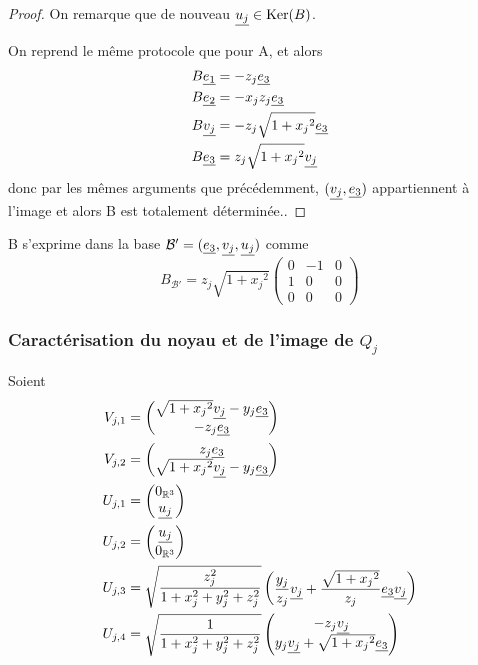 \begin{proof}
  On remarque que de nouveau ${\underline{u_j}} \in \operatorname{Ker}(B)$.

  On reprend le même protocole que pour A, et alors
\begin{align*}
 B \underline{e_1} &= -{z_j} \underline{e_3}\\
 B \underline{e_2} &= -{x_jz_j} \underline{e_3}\\
 B {\underline{v_j}} &= -{z_j}\sqrt{1+{x_j}^2}\underline{e_3}\\
 B \underline{e_3} &= {z_j}\sqrt{1+{x_j}^2}{\underline{v_j}}
\end{align*}
 donc par les mêmes arguments que précédemment, $({\underline{v_j}},\underline{e_3})$ appartiennent à l'image et alors B est totalement déterminée..
\end{proof}

\begin{defn}
  B s'exprime dans la base $\mathcal{B'}= (\underline{e_3},{\underline{v_j}},{\underline{u_j}})$ comme
  \[
    B_\mathcal{B'} = {z_j}\sqrt{1+{x_j}^2}
    \begin{pmatrix}
      0 & -1 & 0 \\
      1 & 0 & 0\\
      0 & 0 & 0
    \end{pmatrix}
  \]
\end{defn}

\subsubsection{Caractérisation du noyau et de l'image de $Q_j$}

\newcommand{\sqx}{\sqrt{1+{x_j}^2}}

Soient
\begin{align*}
V_{j,1} &= \begin{pmatrix}  \sqx {\v{v_j}} - {y_j} \v{e_3} \\ -{z_j} \v{e_3} \end{pmatrix}\\
V_{j,2} &= \begin{pmatrix} {z_j} \v{e_3} \\  \sqx {\v{v_j}} - {y_j} \v{e_3}\end{pmatrix}\\
U_{j,1} &= \begin{pmatrix} 0_{\R^3} \\ {\v{u_j}} \end{pmatrix}\\
U_{j,2} &= \begin{pmatrix} {\v{u_j}} \\0_{\R^3} \end{pmatrix}\\
U_{j,3} &= \sqrt{\frac{z_j^2}{1+x_j^2 +y_j^2+z_j^2}}\begin{pmatrix} \frac{y_j}{z_j}{\v{v_j}} + \frac{\sqx}{z_j}\v{e_3}{\v{v_j}}\end{pmatrix}\\
U_{j,4} &= \sqrt{\frac{1}{1+x_j^2 +y_j^2+z_j^2}}\begin{pmatrix} -z_j\v{v_j} \\ y_j\v{v_j} + \sqx \v{e_3}\end{pmatrix}
\end{align*}

